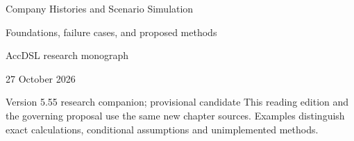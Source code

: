 \documentclass[11pt,a4paper]{report}
\begin{document}
\hypersetup{pageanchor=false}
\begin{titlepage}
{\Huge Company Histories and Scenario Simulation\par}
\vspace{12mm}
{\Large Foundations, failure cases, and proposed methods\par}
\vspace{8mm}
AccDSL research monograph\par 27 October 2026\par Version 5.55 research companion; provisional candidate
\vfill
This reading edition and the governing proposal use the same new chapter sources. Examples distinguish exact calculations, conditional assumptions and unimplemented methods.
\end{titlepage}
\hypersetup{pageanchor=true}
\tableofcontents
\clearpage{}


























\clearpage\label{sim:body-end}

\begingroup\raggedright
\endgroup
\end{document}
